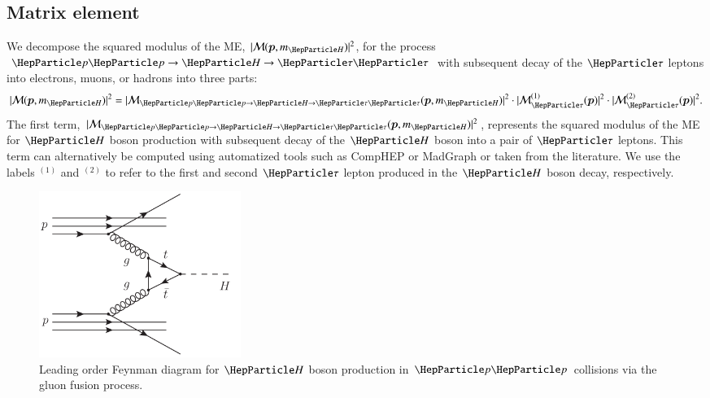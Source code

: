 \subsection{Matrix element}
\label{sec:mem_ME}

We decompose the squared modulus of the ME, $\vert \mathcal{M}(\bm{p},m_{\PHiggs}) \vert^{2}$, for the process $\Pp\Pp \to \PHiggs \to \Pgt\Pgt$
with subsequent decay of the $\Pgt$ leptons into electrons, muons, or
hadrons into three parts:
\begin{equation}
\vert \mathcal{M}(\bm{p},m_{\PHiggs}) \vert^{2} = 
 \vert \mathcal{M}_{\Pp\Pp \to \PHiggs \to \Pgt\Pgt}(\bm{p},m_{\PHiggs}) \vert^{2} 
\cdot \vert \mathcal{M}^{(1)}_{\Pgt}(\bm{p}) \vert^{2} 
\cdot \vert \mathcal{M}^{(2)}_{\Pgt}(\bm{p}) \vert^{2} .
 \label{eq:meFactorization}
\end{equation}
The first term, $\vert \mathcal{M}_{\Pp\Pp \to \PHiggs \to
  \Pgt\Pgt}(\bm{p},m_{\PHiggs}) \vert^{2}$, represents the squared
modulus of the ME for $\PHiggs$ boson production with subsequent decay of the $\PHiggs$ boson into a pair of $\Pgt$ leptons.
This term can alternatively be computed using automatized tools such as CompHEP or MadGraph or taken from the literature.
We use the labels $^{(1)}$ and $^{(2)}$ to refer to the first and second $\Pgt$ lepton produced in the $\PHiggs$ boson decay, respectively.

\begin{figure}
\begin{center}
\includegraphics*[height=54mm]{figures/ggH_FeynmanDiagram.pdf}
\end{center}
\caption{
  Leading order Feynman diagram for $\PHiggs$ boson production in $\Pp\Pp$ collisions via the gluon fusion process.
}
\label{fig:ggH_FeynmanDiagram}
\end{figure}

